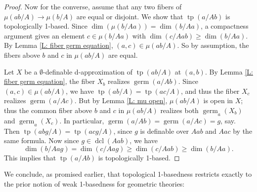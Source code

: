 \documentclass{amsart}
\theoremstyle{definition}
\newcommand{\dcl}{\operatorname{dcl}}
\newcommand{\tp}{\operatorname{tp}}
\begin{document}
\begin{proof}
    Now for the converse, assume that any two fibers of $\mu(ab/A)\rightarrow\mu(b/A)$ are equal or disjoint. We show that $\tp(a/Ab)$ is topologically 1-based. Since $\dim(\mu(b/Aa))=\dim(b/Aa)$, a compactness argument gives an element $c\in\mu(b/Aa)$ with $\dim(c/Aab)\geq\dim(b/Aa)$. By Lemma \ref{L: fiber germ equation}, $(a,c)\in\mu(ab/A)$. So by assumption, the fibers above $b$ and $c$ in $\mu(ab/A)$ are equal.

    Let $X$ be a $\emptyset$-definable d-approximation of $\tp(ab/A)$ at $(a,b)$. By Lemma \ref{L: fiber germ equation}, the fiber $X_b$ realizes $\operatorname{germ}(a/Ab)$. Since $(a,c)\in\mu(ab/A)$, we have $\tp(ab/A)=\tp(ac/A)$, and thus the fiber $X_c$ realizes $\operatorname{germ}(a/Ac)$. But by Lemma \ref{L: mu open}, $\mu(ab/A)$ is open in $X$; thus the common fiber above $b$ and $c$ in $\mu(ab/A)$ realizes both $\operatorname{germ}_a(X_b)$ and $\operatorname{germ}_a(X_c)$. In particular, $\operatorname{germ}(a/Ab)=\operatorname{germ}(a/Ac)=g$, say. Then $\tp(abg/A)=\tp(acg/A)$, since $g$ is definable over $Aab$ and $Aac$ by the same formula. Now since $g\in\dcl(Aab)$, we have $$\dim(b/Aag)=\dim(c/Aag)\geq\dim(c/Aab)\geq\dim(b/Aa).$$  This implies that $\tp(a/Ab)$ is topologically 1-based.
\end{proof}

We conclude, as promised earlier, that topological 1-basedness restricts exactly to the prior notion of weak 1-basedness for geometric theories:
\end{document}
